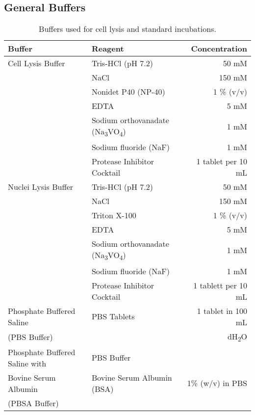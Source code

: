\subsection{General Buffers}
\bigskip
\begin{table}[H]
\begin{center}
\captionsetup{justification=centering}
\caption[General Buffers]{Buffers used for cell lysis and standard incubations.}
\vspace{.5cm}
\begin{tabular}{l l r}
\hline
\label{General buffers}
\textbf{Buffer} & \textbf{Reagent} & \textbf{Concentration}\Tstrut\Bstrut\\
\hline
Cell Lysis Buffer & Tris-HCl (pH 7.2) & 50 mM\\ & NaCl & 150 mM \\ & Nonidet P40 (NP-40) & 1 \% (v/v) \\ & EDTA & 5 mM\\ & Sodium orthovanadate (Na\textsubscript{3}VO\textsubscript{4}) & 1 mM\\ & Sodium fluoride (NaF) & 1 mM\\ & Protease Inhibitor Cocktail & 1 tablet per 10 mL \\ [0.3 cm] 
Nuclei Lysis Buffer & Tris-HCl (pH 7.2) & 50 mM\\ & NaCl & 150 mM\\ & Triton X-100 & 1 \% (v/v)\\ & EDTA & 5 mM\\ & Sodium orthovanadate (Na\textsubscript{3}VO\textsubscript{4}) & 1 mM\\ & Sodium fluoride (NaF) & 1 mM\\ & Protease Inhibitor Cocktail & 1 tablett per 10 mL\\ [0.3 cm]
Phosphate Buffered Saline & PBS Tablets & 1 tablet in 100 mL \\ 
(PBS Buffer) & & dH\textsubscript{2}O\\ [0.3 cm]
Phosphate Buffered Saline with & PBS Buffer & \\
Bovine Serum Albumin & Bovine Serum Albumin (BSA) & 1\% (w/v) in PBS \\
(PBSA Buffer) & & \\[.8ex]
\hline
\end{tabular}
\end{center}
\end{table}

